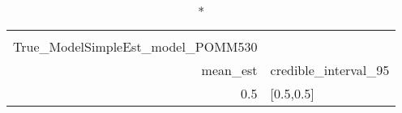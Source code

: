 \begin{longtable}{rl}
\caption*{
{\large alphasummarytable} \\ 
{\small True\_ModelSimpleEst\_model\_POMM530}
} \\ 
\toprule
mean\_est & credible\_interval\_95 \\ 
\midrule
0.5 & [0.5,0.5] \\ 
\bottomrule
\end{longtable}

